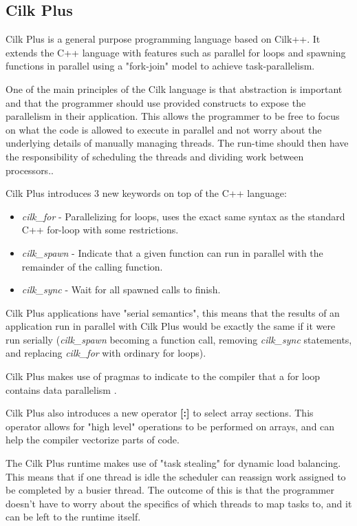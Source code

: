 \subsection{Cilk Plus}

Cilk Plus is a general purpose programming language based on Cilk++\cite{cilk++}. It extends the C++ language with features such as
parallel for loops and spawning functions in parallel using a "fork-join" model to achieve task-parallelism.

One of the main principles of the Cilk language is that abstraction is important and that the programmer should use provided constructs to expose 
the parallelism in their application. This allows the programmer to be free to focus on what the code is allowed to execute in parallel and not worry about the underlying details of manually managing threads. The run-time should then have the responsibility of scheduling the threads and dividing work between
processors.\cite{cilkfaq}. 

Cilk Plus introduces 3 new keywords on top of the C++ language\cite{cilk}: 
\begin{itemize}
    \item \textit{cilk\_for} - Parallelizing for loops, uses the exact same syntax as the standard C++ for-loop
                             with some restrictions.
    \item \textit{cilk\_spawn} - Indicate that a given function can run in parallel with the remainder
                              of the calling function. 
    \item \textit{cilk\_sync} - Wait for all spawned calls to finish.
\end{itemize}

Cilk Plus applications have "serial semantics"\cite{cilk}, this means that the results of an application run
in parallel with Cilk Plus would be exactly the same if it were run
serially (\textit{cilk\_spawn} becoming a function call, removing \textit{cilk\_sync} statements, 
and replacing \textit{cilk\_for} with ordinary for loops).

Cilk Plus makes use of pragmas to indicate to the compiler that a for loop contains data parallelism
\cite{cilkfaq}.

Cilk Plus also introduces a new operator \textbf{[:]} to select array sections\cite{cilkarray}. This operator
allows for "high level" operations to be performed on arrays, and can help the compiler vectorize parts of code.

The Cilk Plus runtime makes use of "task stealing" for dynamic load balancing\cite{cilkfaq}. This 
means that if one thread is idle the scheduler can reassign work assigned to be completed by a busier thread. 
The outcome of this is that the programmer doesn't have to worry about the specifics of which threads
to map tasks to, and it can be left to the runtime itself.


